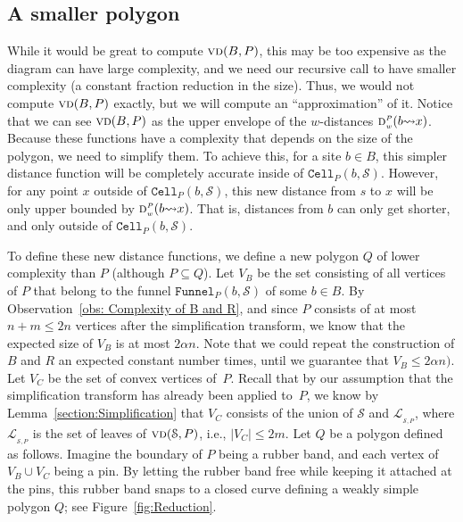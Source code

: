 \documentclass[a4paper,UKenglish]{socg-lipics-v2018}
\newcommand{\s}{\mathcal S}
\newcommand{\dd}[3][P]{\ensuremath{\textsc{d}_{\scriptscriptstyle w}^{\scriptscriptstyle #1}(#2 {\leadsto} #3)}}
\newcommand{\funnel}[2][P]{\ensuremath{\mathtt{Funnel}_{\scriptscriptstyle #1}(#2)}}
\newcommand{\cell}[2][P]{\ensuremath{\mathtt{Cell}_{\scriptscriptstyle #1}(#2)}}
\newcommand{\vd}[2][P]{\textsc{vd}(#2, #1)}
\newcommand{\LL}[1][\s, P]{\ensuremath{\mathcal L_{_{#1}}}}
\begin{document}
\subsection{A smaller polygon}\label{section:Smaller Polygon}
While it would be great to compute $\vd{B}$, this may be too expensive as the diagram can have large complexity, and we need our recursive call to have smaller complexity (a constant fraction reduction in the size). 
Thus, we would not compute $\vd{B}$ exactly, but we will compute an ``approximation'' of it. 
Notice that we can see $\vd{B}$ as the upper envelope of the $w$-distances $\dd{b}{x}$. 
Because these functions have a complexity that depends on the size of the polygon, we need to simplify them.
To achieve this, for a site $b\in B$, this simpler distance function will be completely accurate inside of $\cell{b, \s}$. 
However, for any point $x$ outside of $\cell{b, \s}$, this new distance from $s$ to $x$ will be only upper bounded by $\dd{b}{x}$. 
That is, distances from $b$ can only get shorter, and only outside of $\cell{b, \s}$. 

To define these new distance functions, we define a new polygon $Q$ of lower complexity than $P$ (although $P\subseteq Q$).
Let $V_B$ be the set consisting of all vertices of $P$ that belong to the funnel $\funnel{b, \s}$ of some $b\in B$.
By Observation~\ref{obs: Complexity of B and R}, and since $P$ consists of at most $n+m\leq 2n$ vertices after the simplification transform, we know that the expected size of $V_B$ is at most $2\alpha n$. 
Note that we could repeat the construction of $B$ and $R$ an expected constant number times, until we guarantee that $V_B\leq 2\alpha n)$.
Let $V_C$ be the set of convex vertices of~$P$. Recall that by our assumption that the simplification transform has already been applied to~$P$, 
we know by Lemma~\ref{section:Simplification} that $V_C$ consists of the union of $\s$ and $\LL$, where $\LL$ is the set of leaves of $\vd{\s}$, i.e., $|V_C| \leq 2m$.
Let $Q$ be a polygon defined as follows. 
Imagine the boundary of $P$ being a rubber band, and each vertex of $V_B\cup V_C$ being a pin.
By letting the rubber band free while keeping it attached at the pins, this rubber band snaps to a closed curve defining a weakly simple polygon $Q$; see Figure~\ref{fig:Reduction}.
\end{document}
